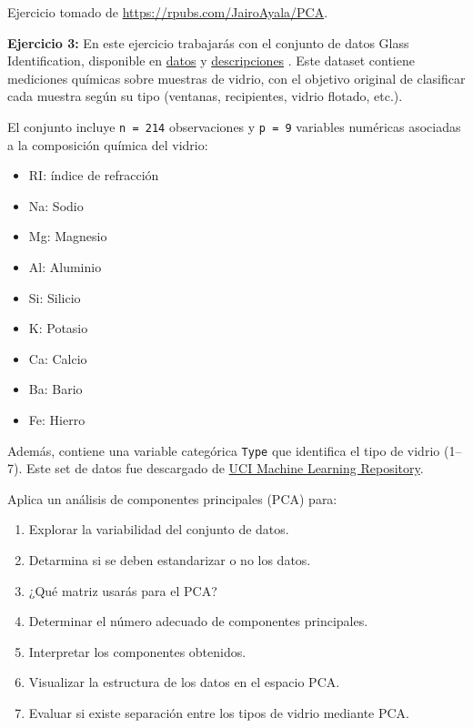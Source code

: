 \documentclass[
]{book}
\begin{document}
Ejercicio tomado de \url{https://rpubs.com/JairoAyala/PCA}.

\textbf{Ejercicio 3:} En este ejercicio trabajarás con el conjunto de datos Glass Identification, disponible en \href{https://github.com/HaydeePeruyero/MultivariateStatisticalAnalysis/tree/main/data/glass_identification_full.csv}{datos} y \href{https://github.com/HaydeePeruyero/MultivariateStatisticalAnalysis/tree/main/data/glass_identification_variables.csv}{descripciones} . Este dataset contiene mediciones químicas sobre muestras de vidrio, con el objetivo original de clasificar cada muestra según su tipo (ventanas, recipientes, vidrio flotado, etc.).

El conjunto incluye \texttt{n\ =\ 214} observaciones y \texttt{p\ =\ 9} variables numéricas asociadas a la composición química del vidrio:

\begin{itemize}
\item
  RI: índice de refracción
\item
  Na: Sodio
\item
  Mg: Magnesio
\item
  Al: Aluminio
\item
  Si: Silicio
\item
  K: Potasio
\item
  Ca: Calcio
\item
  Ba: Bario
\item
  Fe: Hierro
\end{itemize}

Además, contiene una variable categórica \texttt{Type} que identifica el tipo de vidrio (1--7). Este set de datos fue descargado de \href{https://archive.ics.uci.edu/dataset/42/glass+identification}{UCI Machine Learning Repository}.

Aplica un análisis de componentes principales (PCA) para:

\begin{enumerate}
\def\labelenumi{\alph{enumi})}
\item
  Explorar la variabilidad del conjunto de datos.
\item
  Detarmina si se deben estandarizar o no los datos.
\item
  ¿Qué matriz usarás para el PCA?
\item
  Determinar el número adecuado de componentes principales.
\item
  Interpretar los componentes obtenidos.
\item
  Visualizar la estructura de los datos en el espacio PCA.
\item
  Evaluar si existe separación entre los tipos de vidrio mediante PCA.
\end{enumerate}
\end{document}
